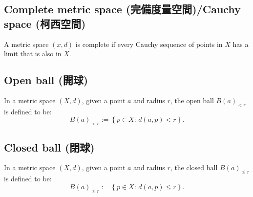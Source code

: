 \documentclass[a4paper,12pt]{article}
\begin{document}
\subsection{Complete metric space (完備度量空間)/Cauchy space (柯西空間)}
A metric space $(x,d)$ is complete if every Cauchy sequence of points in $X$ has a limit that is also in $X$.
\subsection{Open ball (開球)}
In a metric space $(X,d)$, given a point $a$ and radius $r$, the open ball $B(a)_{<r}$ is defined to be:
\[B(a)_{<r}:=\left\{p\in X:\, d(a,p)<r\right\}.\]
\subsection{Closed ball (閉球)}
In a metric space $(X,d)$, given a point $a$ and radius $r$, the closed ball $B(a)_{\leq r}$ is defined to be:
\[B(a)_{\leq r}:=\left\{p\in X:\, d(a,p)\leq r\right\}.\]
\end{document}
